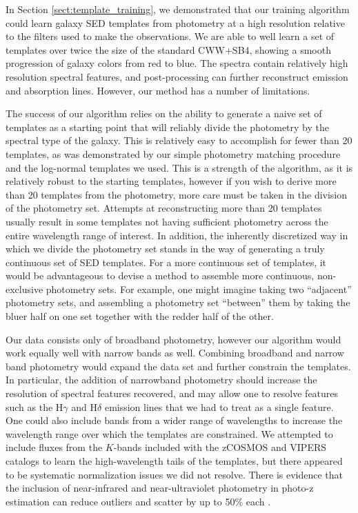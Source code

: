 
\label{sect:discussion}

In Section \ref{sect:template_training}, we demonstrated that our training algorithm could learn galaxy SED templates from photometry at a high resolution relative to the filters used to make the observations.
We are able to well learn a set of templates over twice the size of the standard CWW+SB4, showing a smooth progression of galaxy colors from red to blue.
The spectra contain relatively high resolution spectral features, and post-processing can further reconstruct emission and absorption lines.
However, our method has a number of limitations.

The success of our algorithm relies on the ability to generate a naive set of templates as a starting point that will reliably divide the photometry by the spectral type of the galaxy. 
This is relatively easy to accomplish for fewer than 20 templates, as was demonstrated by our simple photometry matching procedure and the log-normal templates we used.
This is a strength of the algorithm, as it is relatively robust to the starting templates, however if you wish to derive more than 20 templates from the photometry, more care must be taken in the division of the photometry set.
Attempts at reconstructing more than 20 templates usually result in some templates not having sufficient photometry across the entire wavelength range of interest.
In addition, the inherently discretized way in which we divide the photometry set stands in the way of generating a truly continuous set of SED templates.
For a more continuous set of templates, it would be advantageous to devise a method to assemble more continuous, non-exclusive photometry sets.
For example, one might imagine taking two ``adjacent'' photometry sets, and assembling a photometry set ``between'' them by taking the bluer half on one set together with the redder half of the other.

Our data consists only of broadband photometry, however our algorithm would work equally well with narrow bands as well.
Combining broadband and narrow band photometry would expand the data set and further constrain the templates.
In particular, the addition of narrowband photometry should increase the resolution of spectral features recovered, and may allow one to resolve features such as the H$\gamma$ and H$\delta$ emission lines that we had to treat as a single feature.
One could also include bands from a wider range of wavelengths to increase the wavelength range over which the templates are constrained.
We attempted to include fluxes from the $K$-bands included with the zCOSMOS and VIPERS catalogs to learn the high-wavelength tails of the templates, but there appeared to be systematic normalization issues we did not resolve.
There is evidence that the inclusion of near-infrared and near-ultraviolet photometry in photo-z estimation can reduce outliers and scatter by up to 50\% each \citep{Graham2020}.

